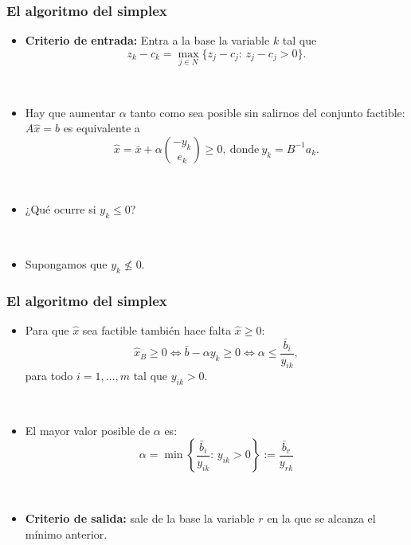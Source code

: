 \documentclass{beamer}
\begin{document}
\begin{frame}
\frametitle{El algoritmo del simplex}



\begin{itemize}
\item \textbf{Criterio de entrada:} Entra a la base la variable $k$ tal que
\[
z_k - c_k = \max_{j\in N}\{z_j-c_j:\, z_j-c_j>0\}.
\]

\


\item Hay que aumentar $\alpha$ tanto como sea posible sin salirnos del conjunto factible: $A\hat{x} = b$ es equivalente a
\[
\hat{x} = \bar{x} + \alpha{-y_k\choose e_k} \geq 0,\ \mbox{donde}\ y_k=B^{-1}a_k.
\]

\

\item ¿Qué ocurre si $y_k\leq 0$?

\

\item Supongamos que $y_k\nleq 0$.


\end{itemize}

\end{frame}
\begin{frame}
\frametitle{El algoritmo del simplex}



\begin{itemize}
\item Para que $\hat{x}$ sea factible también hace falta $\hat{x}\geq 0$:
\[
\hat{x}_B\geq 0\Leftrightarrow\bar{b}-\alpha y_k\geq 0\Leftrightarrow \alpha \leq \frac{\bar{b}_i}{y_{ik}},
\]
para todo $i=1,\ldots,m$ tal que $y_{ik}>0$.

\

\item El mayor valor posible de $\alpha$ es:
\[
\alpha = \min\left\{\frac{\bar{b}_i}{y_{ik}}:\, y_{ik}>0 \right\}:= \frac{\bar{b}_r}{y_{rk}}
\]


\


\item \textbf{Criterio de salida:} sale de la base la variable $r$ en la que se alcanza el mínimo anterior.


\end{itemize}

\end{frame}
\end{document}
